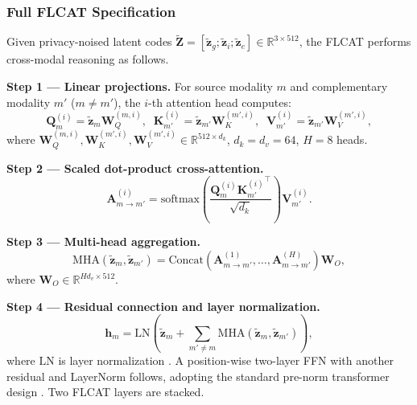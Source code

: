 \documentclass[a4paper,fleqn]{cas-dc}
\begin{document}
\subsubsection{Full FLCAT Specification}

Given privacy-noised latent codes
$\tilde{\mathbf{Z}}\!=\![\tilde{\mathbf{z}}_g;\tilde{\mathbf{z}}_i;
\tilde{\mathbf{z}}_e]\!\in\!\mathbb{R}^{3\times 512}$, the FLCAT performs
cross-modal reasoning as follows.

\textbf{Step 1 — Linear projections.} For source modality $m$ and
complementary modality $m'$ ($m\!\neq\!m'$), the $i$-th attention head
computes:
\begin{equation}
\mathbf{Q}_m^{(i)} \!=\! \tilde{\mathbf{z}}_m \mathbf{W}_Q^{(m,i)},\;\;
\mathbf{K}_{m'}^{(i)} \!=\! \tilde{\mathbf{z}}_{m'}\mathbf{W}_K^{(m',i)},\;\;
\mathbf{V}_{m'}^{(i)} \!=\! \tilde{\mathbf{z}}_{m'}\mathbf{W}_V^{(m',i)},
\label{eq:proj}
\end{equation}
where $\mathbf{W}_Q^{(m,i)}, \mathbf{W}_K^{(m',i)},
\mathbf{W}_V^{(m',i)}\!\in\!\mathbb{R}^{512\times d_k}$,
$d_k\!=\!d_v\!=\!64$, $H\!=\!8$ heads.

\textbf{Step 2 — Scaled dot-product cross-attention.}
\begin{equation}
\mathbf{A}^{(i)}_{m\to m'} =
\mathrm{softmax}\!\left(\frac{\mathbf{Q}_m^{(i)}
{\mathbf{K}_{m'}^{(i)}}^\top}{\sqrt{d_k}}\right)\mathbf{V}_{m'}^{(i)}.
\label{eq:attn}
\end{equation}

\textbf{Step 3 — Multi-head aggregation.}
\begin{equation}
\mathrm{MHA}(\tilde{\mathbf{z}}_m,\tilde{\mathbf{z}}_{m'}) =
\mathrm{Concat}\!\left(\mathbf{A}^{(1)}_{m\to m'},\ldots,
\mathbf{A}^{(H)}_{m\to m'}\right)\!\mathbf{W}_O,
\label{eq:mha}
\end{equation}
where $\mathbf{W}_O\!\in\!\mathbb{R}^{Hd_v\times 512}$.

\textbf{Step 4 — Residual connection and layer normalization.}
\begin{equation}
\mathbf{h}_m = \mathrm{LN}\!\left(\tilde{\mathbf{z}}_m +
\sum_{m'\neq m}\mathrm{MHA}(\tilde{\mathbf{z}}_m,\tilde{\mathbf{z}}_{m'})
\right),
\label{eq:res}
\end{equation}
where $\mathrm{LN}$ is layer normalization \citep{ba2016layernorm}. A
position-wise two-layer FFN with another residual and LayerNorm follows,
adopting the standard pre-norm transformer design \citep{xiong2020prenorm}.
Two FLCAT layers are stacked.
\end{document}
